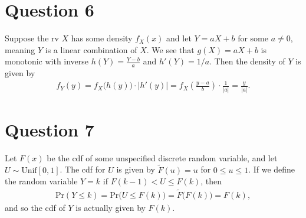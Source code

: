 \documentclass[10pt]{article}
\begin{document}
\section{Question 6} \noindent
Suppose the rv \(X\) has some density \(f_X(x)\) and let \(Y = aX + b\) for some \(a \neq 0\), meaning \(Y\) is a linear combination of \(X\). 
We see that \(g(X) = aX + b\) is monotonic with inverse \(h(Y) = \frac{Y - b}{a}\) and \(h'(Y) = 1/a\). Then the density of \(Y\) is given by 
\begin{align*}
    f_Y(y) = f_X \big( h(y) \big) \cdot \big| h'(y) \big|
    = f_X\left( \frac{y - a}{b} \right) \cdot \frac{1}{|a|} = \frac{y}{|a|}.
\end{align*}

\section{Question 7} \noindent
Let \(F(x)\) be the cdf of some unspecified discrete random variable,
and let \(U \sim \mathrm{Unif}[0,1]\).
The cdf for \(U\) is given by \(\tilde{F}(u) = u\) for \(0 \le u \le 1\). 
If we define the random variable \(Y = k\) if \(F(k-1) < U \le F(k)\), then 
\begin{align*}
    \mathrm{Pr}(Y \le k) = \mathrm{Pr} \big( U \le F(k) \big) = \tilde{F} \big( F(k) \big) = F(k),
\end{align*}
and so the cdf of \(Y\) is actually given by \(F(k)\). 

\end{document}
